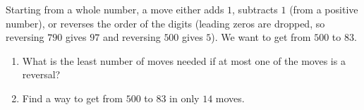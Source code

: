 Starting from a whole number, a move either adds $1$, subtracts $1$ (from a positive number), or reverses the order of the digits (leading zeros are dropped, so reversing $790$ gives $97$ and reversing $500$ gives $5$). We want to get from $500$ to $83$.
\begin{enumerate}
\item[(a)] What is the least number of moves needed if at most one of the moves is a reversal?
\item[(b)] Find a way to get from $500$ to $83$ in only $14$ moves.
\end{enumerate}
